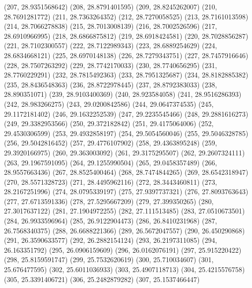 {					(207, 28.9351568642)
					(208, 28.8791401595)
					(209, 28.8245262007)
					(210, 28.7691281772)
					(211, 28.7363264352)
					(212, 28.7270058525)
					(213, 28.7161013598)
					(214, 28.7066278838)
					(215, 28.7013008139)
					(216, 28.7002526596)
					(217, 28.6910966995)
					(218, 28.6866875812)
					(219, 28.6918424581)
					(220, 28.7028856287)
					(221, 28.7102300557)
					(222, 28.7122989343)
					(223, 28.6889254629)
					(224, 28.6834668121)
					(225, 28.6970148138)
					(226, 28.7279343751)
					(227, 28.7457916646)
					(228, 28.7507263292)
					(229, 28.7742170033)
					(230, 28.7740656295)
					(231, 28.7760229291)
					(232, 28.7815492363)
					(233, 28.7951325687)
					(234, 28.8182885382)
					(235, 28.8436548363)
					(236, 28.8722978445)
					(237, 28.8792383033)
					(238, 28.890351071)
					(239, 28.9103400369)
					(240, 28.923584058)
					(241, 28.9516286393)
					(242, 28.983266275)
					(243, 29.0200842586)
					(244, 29.0647374535)
					(245, 29.1172181402)
					(246, 29.1632252539)
					(247, 29.2235545466)
					(248, 29.2881616273)
					(249, 29.3382953566)
					(250, 29.372182842)
					(251, 29.4175064006)
					(252, 29.4530306599)
					(253, 29.4932858197)
					(254, 29.5054560046)
					(255, 29.5046328785)
					(256, 29.5042816452)
					(257, 29.4776107902)
					(258, 29.4363895248)
					(259, 29.3920166975)
					(260, 29.363003092)
					(261, 29.3175295507)
					(262, 29.2607324111)
					(263, 29.1967591095)
					(264, 29.1255990504)
					(265, 29.0458357489)
					(266, 28.9557663436)
					(267, 28.8525400464)
					(268, 28.7474844265)
					(269, 28.6542318947)
					(270, 28.5571328723)
					(271, 28.4495962116)
					(272, 28.3443460811)
					(273, 28.2167251996)
					(274, 28.0795339197)
					(275, 27.9397737321)
					(276, 27.8093763643)
					(277, 27.6713591336)
					(278, 27.5295667209)
					(279, 27.399350265)
					(280, 27.3017637122)
					(281, 27.1904972255)
					(282, 27.111513485)
					(283, 27.0510673501)
					(284, 26.9933596964)
					(285, 26.9122904473)
					(286, 26.8410231968)
					(287, 26.7568340375)
					(288, 26.6688221366)
					(289, 26.5672047557)
					(290, 26.450290868)
					(291, 26.3590633577)
					(292, 26.2882154124)
					(293, 26.2197311085)
					(294, 26.163351792)
					(295, 26.0906159609)
					(296, 26.0162076191)
					(297, 25.915220422)
					(298, 25.8159591747)
					(299, 25.7532620619)
					(300, 25.710034607)
					(301, 25.676477595)
					(302, 25.6011036933)
					(303, 25.4907118713)
					(304, 25.4215576758)
					(305, 25.3391406721)
					(306, 25.2482879282)
					(307, 25.1537466447)
}
